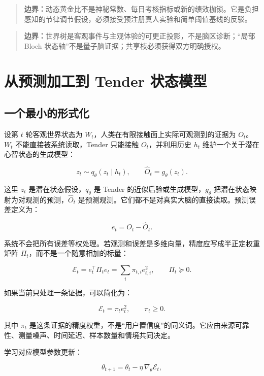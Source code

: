 \documentclass[UTF8,a4paper,11pt]{ctexart}
\newcommand{\boundary}[1]{\begin{quote}\noindent\textbf{\color{TenderPink}边界：}#1\end{quote}}
\begin{document}
\boundary{动态黄金比不是神秘常数、每日考核指标或新的绩效枷锁。它是负担感知的节律调节假设，必须接受预注册真人实验和简单阈值基线的反驳。}

\boundary{世界树是客观事件与主观体验的可更正投影，不是脑区诊断；“局部 Bloch 状态轴”不是量子脑证据；共享枝必须获得双方明确授权。}

\section{从预测加工到 Tender 状态模型}

\subsection{一个最小的形式化}

设第 \(t\) 轮客观世界状态为 \(W_t\)，人类在有限接触面上实际可观测到的证据为 \(O_t\)。\(W_t\) 不能直接被系统读取，Tender 只能接触 \(O_t\)，并利用历史 \(h_t\) 维护一个关于潜在心智状态的生成模型：

\begin{equation}
z_t \sim q_\theta(z_t\mid h_t),\qquad
\hat O_t=g_\theta(z_t).
\end{equation}

这里 \(z_t\) 是潜在状态假设，\(q_\theta\) 是 Tender 的近似后验或生成模型，\(g_\theta\) 把潜在状态映射为对观测的预测，\(\hat O_t\) 是预测观测。它们都不是对真实大脑的直接读取。预测误差定义为：

\begin{equation}
e_t=O_t-\hat O_t.
\end{equation}

系统不会把所有误差等权处理。若观测和误差是多维向量，精度应写成半正定权重矩阵 \(\Pi_t\)，而不是一个随意相加的标量：

\begin{equation}
\mathcal E_t
=e_t^{\top}\Pi_t e_t
=\sum_i \pi_{t,i}e_{t,i}^{2},
\qquad \Pi_t\succeq 0.
\end{equation}

如果当前只处理一条证据，可以简化为：

\begin{equation}
\mathcal E_t=\pi_t e_t^2,
\qquad \pi_t\geq 0.
\end{equation}

其中 \(\pi_t\) 是这条证据的精度权重，不是“用户置信度”的同义词。它应由来源可靠性、测量噪声、时间延迟、样本数量和情境共同决定。

学习对应模型参数更新：

\begin{equation}
\theta_{t+1}
=\theta_t-\eta\,\nabla_\theta\mathcal E_t,
\end{equation}
\end{document}
